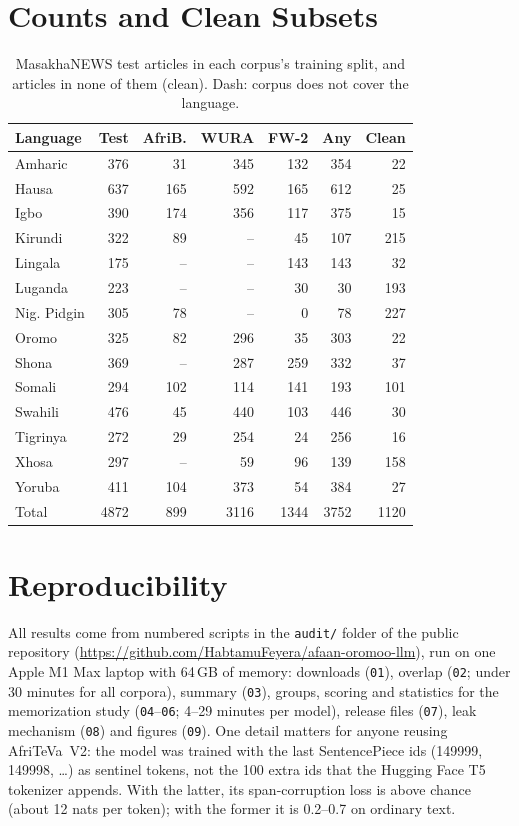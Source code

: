 \documentclass[11pt]{article}
\begin{document}


\appendix

\section{Counts and Clean Subsets}

\begin{table}[h]
\centering
\small
\setlength{\tabcolsep}{2.5pt}
\begin{tabular}{@{}lrrrrrr@{}}
\toprule
Language & Test & AfriB. & WURA & FW-2 & Any & Clean \\
\midrule
Amharic & 376 & 31 & 345 & 132 & 354 & 22 \\
Hausa & 637 & 165 & 592 & 165 & 612 & 25 \\
Igbo & 390 & 174 & 356 & 117 & 375 & 15 \\
Kirundi & 322 & 89 & -- & 45 & 107 & 215 \\
Lingala & 175 & -- & -- & 143 & 143 & 32 \\
Luganda & 223 & -- & -- & 30 & 30 & 193 \\
Nig. Pidgin & 305 & 78 & -- & 0 & 78 & 227 \\
Oromo & 325 & 82 & 296 & 35 & 303 & 22 \\
Shona & 369 & -- & 287 & 259 & 332 & 37 \\
Somali & 294 & 102 & 114 & 141 & 193 & 101 \\
Swahili & 476 & 45 & 440 & 103 & 446 & 30 \\
Tigrinya & 272 & 29 & 254 & 24 & 256 & 16 \\
Xhosa & 297 & -- & 59 & 96 & 139 & 158 \\
Yoruba & 411 & 104 & 373 & 54 & 384 & 27 \\
\midrule
Total & 4872 & 899 & 3116 & 1344 & 3752 & 1120 \\
\bottomrule
\end{tabular}
\caption{MasakhaNEWS test articles in each corpus's training split, and articles in none of them (clean). Dash: corpus does not cover the language.}
\label{tab:counts}
\end{table}

\section{Reproducibility}

All results come from numbered scripts in the \texttt{audit/} folder of the public repository (\url{https://github.com/HabtamuFeyera/afaan-oromoo-llm}), run on one Apple M1 Max laptop with 64\,GB of memory: downloads (\texttt{01}), overlap (\texttt{02}; under 30 minutes for all corpora), summary (\texttt{03}), groups, scoring and statistics for the memorization study (\texttt{04}--\texttt{06}; 4--29 minutes per model), release files (\texttt{07}), leak mechanism (\texttt{08}) and figures (\texttt{09}). One detail matters for anyone reusing AfriTeVa~V2: the model was trained with the last SentencePiece ids (149999, 149998, \dots) as sentinel tokens, not the 100 extra ids that the Hugging Face T5 tokenizer appends. With the latter, its span-corruption loss is above chance (about 12 nats per token); with the former it is 0.2--0.7 on ordinary text.
\end{document}
